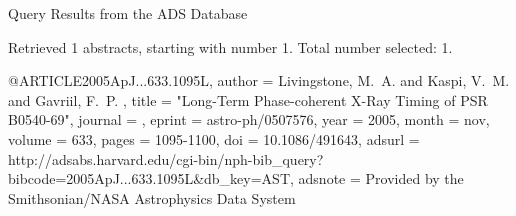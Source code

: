 Query Results from the ADS Database


Retrieved 1 abstracts, starting with number 1.  Total number selected: 1.

@ARTICLE{2005ApJ...633.1095L,
   author = {{Livingstone}, M.~A. and {Kaspi}, V.~M. and {Gavriil}, F.~P.
	},
    title = "{Long-Term Phase-coherent X-Ray Timing of PSR B0540-69}",
  journal = {\apj},
   eprint = {astro-ph/0507576},
     year = 2005,
    month = nov,
   volume = 633,
    pages = {1095-1100},
      doi = {10.1086/491643},
   adsurl = {http://adsabs.harvard.edu/cgi-bin/nph-bib_query?bibcode=2005ApJ...633.1095L&db_key=AST},
  adsnote = {Provided by the Smithsonian/NASA Astrophysics Data System}
}


